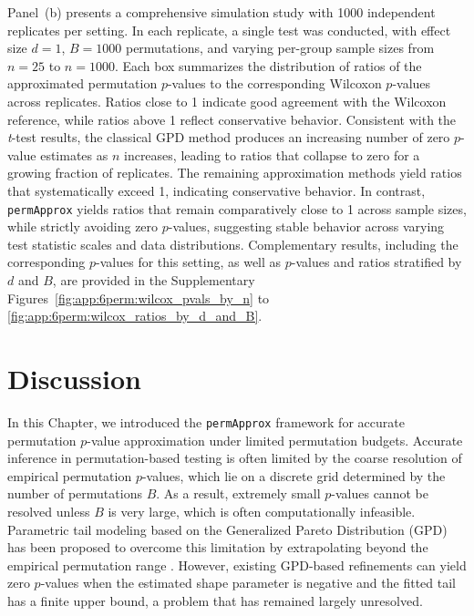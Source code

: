 Panel~(b) presents a comprehensive simulation study with 1000 independent replicates per setting. In each replicate, a single test was conducted, with effect size $d=1$, $B=1000$ permutations, and varying per-group sample sizes from $n=25$ to $n=1000$. Each box summarizes the distribution of ratios of the approximated permutation $p$-values to the corresponding Wilcoxon $p$-values across replicates. 
Ratios close to 1 indicate good agreement with the Wilcoxon reference, while ratios above 1 reflect conservative behavior.
Consistent with the \textit{t}-test results, the classical GPD method produces an increasing number of zero $p$-value estimates as $n$ increases, leading to ratios that collapse to zero for a growing fraction of replicates. 
The remaining approximation methods yield ratios that systematically exceed 1, indicating conservative behavior. 
In contrast, \texttt{permApprox} yields ratios that remain comparatively close to 1 across sample sizes, while strictly avoiding zero $p$-values, suggesting stable behavior across varying test statistic scales and data distributions.
Complementary results, including the corresponding $p$-values for this setting, as well as $p$-values and ratios stratified by $d$ and $B$, are provided in the Supplementary Figures~\ref{fig:app:6perm:wilcox_pvals_by_n} to \ref{fig:app:6perm:wilcox_ratios_by_d_and_B}.


\section{Discussion}
\label{sec:6perm:discussion}

In this Chapter, we introduced the \texttt{permApprox} framework for accurate permutation $p$-value approximation under limited permutation budgets. Accurate inference in permutation-based testing is often limited by the coarse resolution of empirical permutation $p$-values, which lie on a discrete grid determined by the number of permutations $B$. As a result, extremely small $p$-values cannot be resolved unless $B$ is very large, which is often computationally infeasible. Parametric tail modeling based on the Generalized Pareto Distribution (GPD) has been proposed to overcome this limitation by extrapolating beyond the empirical permutation range \citep{knijnenburg2009fewer}. However, existing GPD-based refinements can yield zero $p$-values when the estimated shape parameter is negative and the fitted tail has a finite upper bound, a problem that has remained largely unresolved. 

